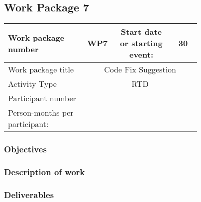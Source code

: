 \subsection{Work Package 7}

\begin{table}[hbpt]\centering
	\begin{tabular}{|p{0.35\linewidth}|p{0.06\linewidth}|p{0.06\linewidth}|p{0.06\linewidth}|
         p{0.06\linewidth}|p{0.06\linewidth}|p{0.06\linewidth}|p{0.06\linewidth}|}\hline
		 Work package number& WP7 &
		 \multicolumn{4}{|c|}{Start date or starting event:}{}&
		 \multicolumn{2}{|c|}{                        30 }{}\\\hline
		 Work package title&\multicolumn{7}{|c|}{ Code Fix Suggestion }{}\\\hline
		 Activity Type&\multicolumn{7}{|c|}{      RTD }{}\\\hline
		 Participant number & ~ & ~ & ~ & ~ & ~ & ~ & ~ \\\hline
		 Person-months per participant: & ~ & ~ & ~ & ~ & ~ & ~ & ~ \\\hline
	\end{tabular}
\end{table}

\subsubsection{Objectives}

\subsubsection{Description of work}

\subsubsection{Deliverables}